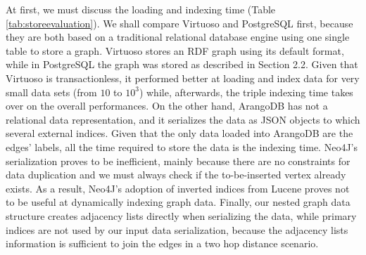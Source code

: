 At first, we must discuss the  loading and indexing time (Table \ref{tab:storeevaluation}). We shall  compare Virtuoso and PostgreSQL first, because they are both based on a traditional relational database engine using one single table to store a graph. Virtuoso  stores an RDF graph using its default format, while in PostgreSQL the graph was stored as described in Section 2.2. Given that Virtuoso is transactionless, it performed better at loading and index data for very small data sets (from $10$ to $10^3$) while, afterwards, the triple indexing time takes over on the overall performances. On the other hand, ArangoDB has not a relational data representation, and it  serializes the data as JSON objects to which several external indices. Given that the only data loaded into ArangoDB are the edges' labels, all the time required to store the data is the indexing time. Neo4J's serialization proves to be inefficient, mainly because there are no constraints for data duplication and we must always check if the to-be-inserted vertex already exists. As a result, Neo4J's adoption of inverted indices from Lucene proves not to be useful at dynamically indexing graph data. Finally, our nested graph data structure creates adjacency lists directly when serializing the data, while primary indices are not used by our input data serialization, because the adjacency lists information is sufficient to join the edges in a two hop distance scenario.

